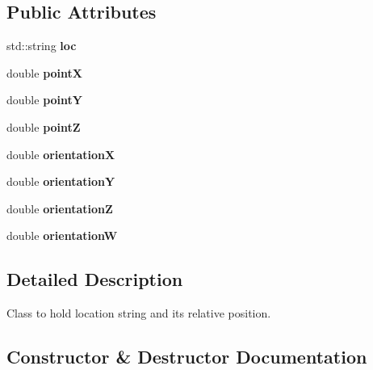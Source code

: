 \subsection*{Public Attributes}
\begin{DoxyCompactItemize}
\item 
std\+::string {\bfseries loc}\hypertarget{class_location_acb149261c9065b13e25adadc2c8036c4}{}\label{class_location_acb149261c9065b13e25adadc2c8036c4}

\item 
double {\bfseries pointX}\hypertarget{class_location_af0beac370d5f9df30462b8000958387b}{}\label{class_location_af0beac370d5f9df30462b8000958387b}

\item 
double {\bfseries pointY}\hypertarget{class_location_aad1008cf037174d2b52af361a6f52701}{}\label{class_location_aad1008cf037174d2b52af361a6f52701}

\item 
double {\bfseries pointZ}\hypertarget{class_location_a1e86fb3c090e7e1e86984da3f2993dfe}{}\label{class_location_a1e86fb3c090e7e1e86984da3f2993dfe}

\item 
double {\bfseries orientationX}\hypertarget{class_location_a0ceacb687320b4aa9df19e243a8a7b1c}{}\label{class_location_a0ceacb687320b4aa9df19e243a8a7b1c}

\item 
double {\bfseries orientationY}\hypertarget{class_location_aec56f86db4a3c5463e34671e6cc0e1dd}{}\label{class_location_aec56f86db4a3c5463e34671e6cc0e1dd}

\item 
double {\bfseries orientationZ}\hypertarget{class_location_a59a0b3c3172700b17005bb4bf6a70855}{}\label{class_location_a59a0b3c3172700b17005bb4bf6a70855}

\item 
double {\bfseries orientationW}\hypertarget{class_location_a441a7aa8ebf4127a0359cb1133db6c9a}{}\label{class_location_a441a7aa8ebf4127a0359cb1133db6c9a}

\end{DoxyCompactItemize}


\subsection{Detailed Description}
Class to hold location string and its relative position. 

\subsection{Constructor \& Destructor Documentation}
